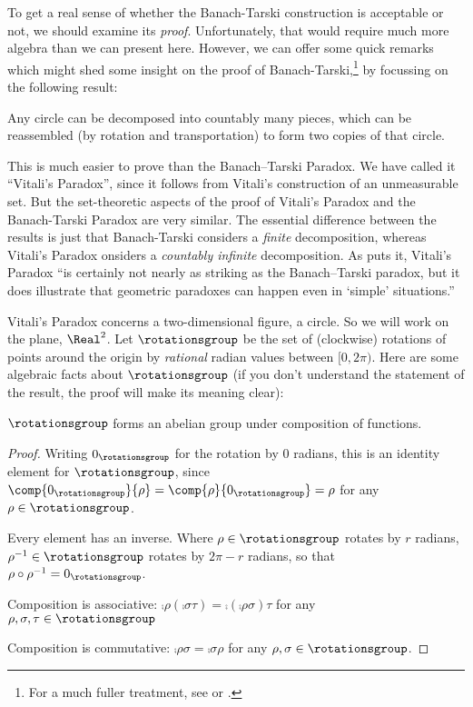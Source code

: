 \documentclass[../../../include/open-logic-section]{subfiles}
\begin{document}

To get a real sense of whether the Banach-Tarski construction is
acceptable or not, we should examine its \emph{proof}. Unfortunately,
that would require much more algebra than we can present here.
However, we can offer some quick remarks which might shed some insight
on the proof of Banach-Tarski,\footnote{For a much fuller treatment,
see \cite{Weston2003} or \cite{Wagon2016}.} by focussing on the
following result:

\begin{thm}
Any circle can be decomposed into countably many pieces, which can be
reassembled (by rotation and transportation) to form two copies of
that circle.
\end{thm}

This is much easier to prove than the Banach--Tarski Paradox. We have
called it ``Vitali's Paradox'', since it follows from Vitali's
\citeyear{Vitali1905} construction of an unmeasurable set.  But the
set-theoretic aspects of the proof of Vitali's Paradox and the
Banach-Tarski Paradox are very similar. The essential difference
between the results is just that Banach-Tarski considers a
\emph{finite} decomposition, whereas Vitali's Paradox onsiders a
\emph{countably infinite} decomposition.  As \citet{Weston2003}
puts it, Vitali's Paradox ``is certainly not nearly as striking as the
Banach--Tarski paradox, but it does illustrate that geometric
paradoxes can  happen even in `simple' situations.'' 

Vitali's Paradox concerns a two-dimensional figure, a circle. So we
will work on the plane, $\Real^2$. Let $\rotationsgroup$ be the set of
(clockwise) rotations of points around the origin by \emph{rational}
radian values between $[0,2\pi)$. Here are some algebraic facts about
$\rotationsgroup$ (if you don't understand the statement of the
result, the proof will make its meaning clear):

\begin{lem}
$\rotationsgroup$ forms an abelian {group} under composition of functions.
\end{lem}

\begin{proof}
Writing $0_{\rotationsgroup}$ for the rotation by $0$ radians, this is
an identity element for $\rotationsgroup$, since
$\comp{0_{\rotationsgroup}}{\rho} = \comp{\rho}{0_{\rotationsgroup}} =
\rho$ for any $\rho \in \rotationsgroup$.

Every element has an inverse. Where $\rho \in \rotationsgroup$ rotates
by $r$ radians, $\rho^{-1} \in \rotationsgroup$ rotates by $2\pi - r$
radians, so that $\rho \circ \rho^{-1} = 0_\rotationsgroup$.

Composition is associative: $\comp{\rho}{(\comp{\sigma}{\tau})} =
\comp{(\comp{\rho}{\sigma})}{\tau}$ for any $\rho, \sigma, \tau \in
\rotationsgroup$

Composition is commutative: $\comp{\rho}{\sigma} =
\comp{\sigma}{\rho}$ for any $\rho, \sigma \in \rotationsgroup$.
\end{proof}
\end{document}

